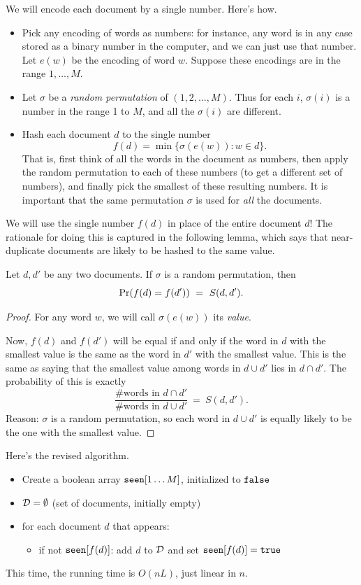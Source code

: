 We will encode each document by a single number. Here's how.
\begin{itemize}
\item Pick any encoding of words as numbers: for instance, any word is in any case stored
as a binary number in the computer, and we can just use that number. Let $e(w)$ be the encoding
of word $w$. Suppose these encodings are in the range $1,\ldots, M$.
\item Let $\sigma$ be a {\it random permutation} of $(1,2,\ldots, M)$. Thus for each $i$, 
$\sigma(i)$ is a number in the range 1 to $M$, and all the $\sigma(i)$ are different.
\item Hash each document $d$ to the single number
$$ f(d) = \min \{\sigma(e(w)): w \in d\} .$$
That is, first think of all the words in the document as numbers, then apply the random 
permutation to each of these numbers (to get a different set of numbers), and finally pick
the smallest of these resulting numbers. It is important that the same permutation $\sigma$
is used for {\it all} the documents.
\end{itemize}

We will use the single number $f(d)$ in place of the entire document $d$! The rationale for doing 
this is captured in the following lemma, which says that near-duplicate documents are likely to
be hashed to the same value.
\begin{lemma}
Let $d,d'$ be any two documents. If $\sigma$ is a random permutation, then
$$ \mbox{\rm Pr}(f(d) = f(d')) \ = \ S(d,d') .$$
\end{lemma}
\begin{proof}
For any word $w$, we will call $\sigma(e(w))$ its {\it value}.

Now, $f(d)$ and $f(d')$ will be equal if and only if the word in $d$ with the
smallest value is the same as the word in $d'$ with the smallest value. This is the same 
as saying that the smallest value among words in $d \cup d'$ lies in $d \cap d'$. The 
probability of this is exactly
$$ \frac{\mbox{\# words in $d \cap d'$}}{\mbox{\# words in $d \cup d'$}} \ = \ S(d,d').$$
Reason: $\sigma$ is a random permutation, so each word in $d \cup d'$ is equally likely to 
be the one with the smallest value.
\end{proof}

Here's the revised algorithm.
\begin{itemize}
\item Create a boolean array ${\tt seen}[1\ldots M]$, initialized to ${\tt false}$
\item ${\cal D} = \emptyset$ (set of documents, initially empty)
\item for each document $d$ that appears:
\begin{itemize}
\item if not ${\tt seen}[f(d)]$: add $d$ to ${\cal D}$ and set ${\tt seen}[f(d)] = {\tt true}$
\end{itemize}
\end{itemize}
This time, the running time is $O(nL)$, just linear in $n$.
\\

